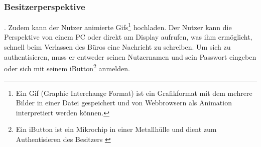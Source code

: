 \subsubsection{Besitzerperspektive}
. Zudem kann der Nutzer animierte Gifs\footnote{Ein Gif (Graphic Interchange Format) ist ein Grafikformat mit dem mehrere Bilder in einer Datei gespeichert und von Webbrowsern als Animation interpretiert werden können.} hochladen.
Der Nutzer kann die Perspektive von einem PC oder direkt am Display aufrufen, was ihm ermöglicht, schnell beim Verlassen des Büros eine Nachricht zu schreiben. Um sich zu authentisieren, muss er entweder seinen Nutzernamen und sein Passwort eingeben oder sich mit seinem iButton\footnote{Ein iButton ist ein Mikrochip in einer Metallhülle und dient \bspw zum Authentisieren des Besitzers \cite{iButton:website}} anmelden.
